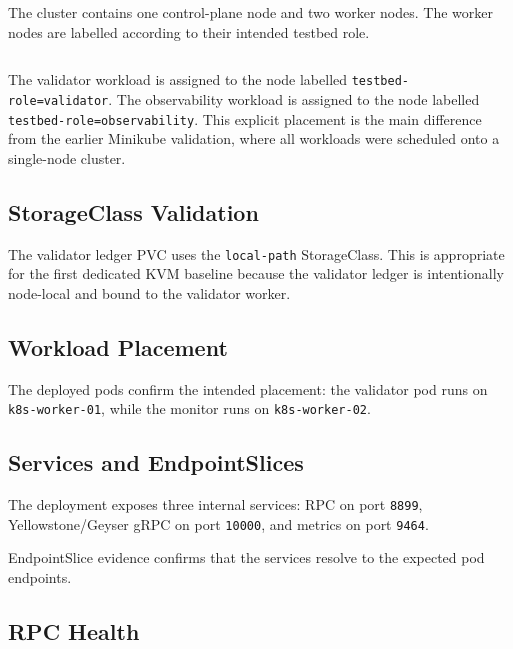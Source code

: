 \documentclass[11pt,a4paper]{article}
\begin{document}
The cluster contains one control-plane node and two worker nodes. The worker nodes are labelled according to their intended testbed role.

\begin{lstlisting}

\end{lstlisting}

The validator workload is assigned to the node labelled \texttt{testbed-role=validator}. The observability workload is assigned to the node labelled \texttt{testbed-role=observability}. This explicit placement is the main difference from the earlier Minikube validation, where all workloads were scheduled onto a single-node cluster.

\subsection{StorageClass Validation}

The validator ledger PVC uses the \texttt{local-path} StorageClass. This is appropriate for the first dedicated KVM baseline because the validator ledger is intentionally node-local and bound to the validator worker.



\subsection{Workload Placement}

The deployed pods confirm the intended placement: the validator pod runs on \texttt{k8s-worker-01}, while the monitor runs on \texttt{k8s-worker-02}.



\subsection{Services and EndpointSlices}

The deployment exposes three internal services: RPC on port \texttt{8899}, Yellowstone/Geyser gRPC on port \texttt{10000}, and metrics on port \texttt{9464}.



EndpointSlice evidence confirms that the services resolve to the expected pod endpoints.



\subsection{RPC Health}
\end{document}
